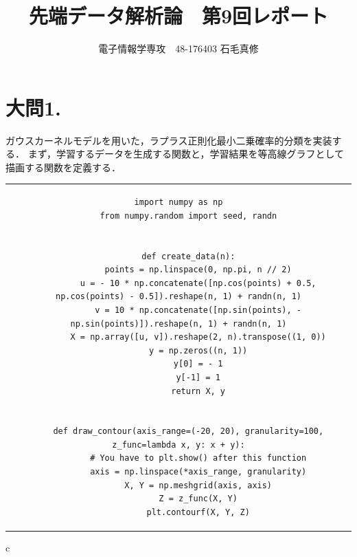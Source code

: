 \documentclass[dvipdfmx]{jsarticle}
\title{先端データ解析論　第9回レポート}
\author{電子情報学専攻　48-176403 石毛真修}
\begin{document}
\maketitle


\section*{大問1.}
ガウスカーネルモデルを用いた，ラプラス正則化最小二乗確率的分類を実装する．
まず，学習するデータを生成する関数と，学習結果を等高線グラフとして描画する関数を定義する．
\begin{center}
\begin{tabular}{c}
  \begin{lstlisting}[]
    import numpy as np
    from numpy.random import seed, randn


    def create_data(n):
        points = np.linspace(0, np.pi, n // 2)
        u = - 10 * np.concatenate([np.cos(points) + 0.5, np.cos(points) - 0.5]).reshape(n, 1) + randn(n, 1)
        v = 10 * np.concatenate([np.sin(points), - np.sin(points)]).reshape(n, 1) + randn(n, 1)
        X = np.array([u, v]).reshape(2, n).transpose((1, 0))
        y = np.zeros((n, 1))
        y[0] = - 1
        y[-1] = 1
        return X, y


    def draw_contour(axis_range=(-20, 20), granularity=100, z_func=lambda x, y: x + y):
        # You have to plt.show() after this function
        axis = np.linspace(*axis_range, granularity)
        X, Y = np.meshgrid(axis, axis)
        Z = z_func(X, Y)
        plt.contourf(X, Y, Z)

  \end{lstlisting}
\end{tabular}{c}
\end{center}
\end{document}
